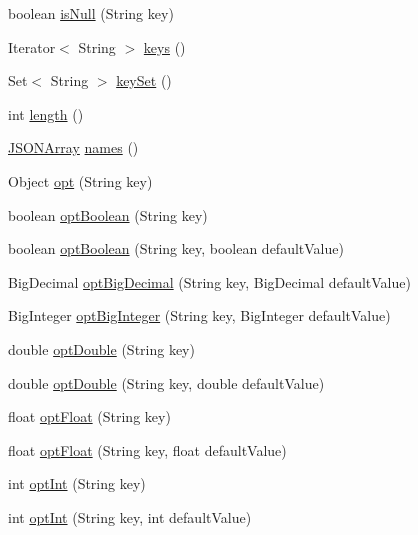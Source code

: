 \begin{DoxyCompactItemize}
\item 
boolean \hyperlink{classorg_1_1json_1_1JSONObject_a8de41c5807522df5a7b888a0ffd6b69b}{is\-Null} (String key)
\item 
Iterator$<$ String $>$ \hyperlink{classorg_1_1json_1_1JSONObject_aff3bbed67e07e0714a04470d0640a5be}{keys} ()
\item 
Set$<$ String $>$ \hyperlink{classorg_1_1json_1_1JSONObject_a6ab562229c57b51785e17c4179b31c87}{key\-Set} ()
\item 
int \hyperlink{classorg_1_1json_1_1JSONObject_a2c47910737728e063a8395d3a9152d42}{length} ()
\item 
\hyperlink{classorg_1_1json_1_1JSONArray}{J\-S\-O\-N\-Array} \hyperlink{classorg_1_1json_1_1JSONObject_a02e83de70e290231527d1760c4dd30fc}{names} ()
\item 
Object \hyperlink{classorg_1_1json_1_1JSONObject_a51eeabb3fde00474d3ffd7381ad5d311}{opt} (String key)
\item 
boolean \hyperlink{classorg_1_1json_1_1JSONObject_ae2fd84f0e465ade590e47ba7bdce683b}{opt\-Boolean} (String key)
\item 
boolean \hyperlink{classorg_1_1json_1_1JSONObject_ae46a66bde2bc443b63ed93cb26677e34}{opt\-Boolean} (String key, boolean default\-Value)
\item 
Big\-Decimal \hyperlink{classorg_1_1json_1_1JSONObject_a5bfcfddd039cd791d1337f575d06540a}{opt\-Big\-Decimal} (String key, Big\-Decimal default\-Value)
\item 
Big\-Integer \hyperlink{classorg_1_1json_1_1JSONObject_a3117de378a1e3df3149be1d951db7ad0}{opt\-Big\-Integer} (String key, Big\-Integer default\-Value)
\item 
double \hyperlink{classorg_1_1json_1_1JSONObject_a69bf1cb7de87f4b196c0081ddc4c6f58}{opt\-Double} (String key)
\item 
double \hyperlink{classorg_1_1json_1_1JSONObject_ab5c3964b0ef382a85927000e743f8281}{opt\-Double} (String key, double default\-Value)
\item 
float \hyperlink{classorg_1_1json_1_1JSONObject_ab51c4b3e6851330f5311731ba0808297}{opt\-Float} (String key)
\item 
float \hyperlink{classorg_1_1json_1_1JSONObject_a0954db33b1a3c33b493310798218c9a9}{opt\-Float} (String key, float default\-Value)
\item 
int \hyperlink{classorg_1_1json_1_1JSONObject_abeb2c17bd5a09ab51b25e4b330983a97}{opt\-Int} (String key)
\item 
int \hyperlink{classorg_1_1json_1_1JSONObject_a80567fb28cd07b9d5148d7610605305e}{opt\-Int} (String key, int default\-Value)

\end{DoxyCompactItemize}
